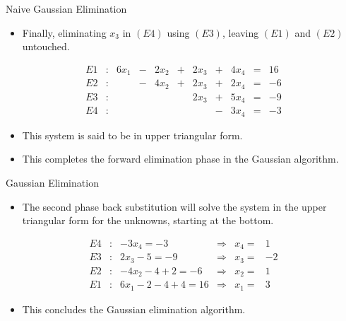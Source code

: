 \documentclass{beamer}
\begin{document}
\begin{frame}{Naive Gaussian Elimination}
\begin{itemize}
\item Finally, eliminating $x_3$ in $(E4)$ using $(E3)$, leaving $(E1)$ and $(E2)$ untouched.
\end{itemize}
\begin{block}{}

\begin{align*}
E1&:&6x_1&-&2x_2&+&2 x_3 &+&4 x_4 &=&16\\
E2&:&&-&4x_2&+&2x_3&+&2x_4 &=&-6\\
E3&:&&&&&2x_3&+&5x_4 &=&-9\\
E4&:&&&&&&-&3x_4 &=&-3 
\end{align*}
\end{block}
\begin{itemize}
\item This system is said to be in \alert{upper triangular form}. 
\item This completes the \alert{forward elimination} phase in the Gaussian algorithm.
\end{itemize}


\end{frame}
\begin{frame}{Gaussian Elimination}
\begin{itemize}
\item The second phase  \alert{back substitution} will solve the system in the upper triangular form for the unknowns, starting at the
bottom. 
\end{itemize}
\begin{block}{}
\begin{align*}
E4&:& -3x_4=-3 &\Longrightarrow& x_4=&1\\
E3 &:& 2x_3-5=-9&\Longrightarrow&	x_3=&-2\\
E2&:& -4x_2-4+2=-6 &\Longrightarrow& x_2=&1\\
E1&:&6x_1-2-4 +4 =16 &\Longrightarrow& x_1=&3
\end{align*}
\end{block}
\begin{itemize}
\item This concludes the Gaussian elimination algorithm. 
\end{itemize}


\end{frame}
\end{document}
